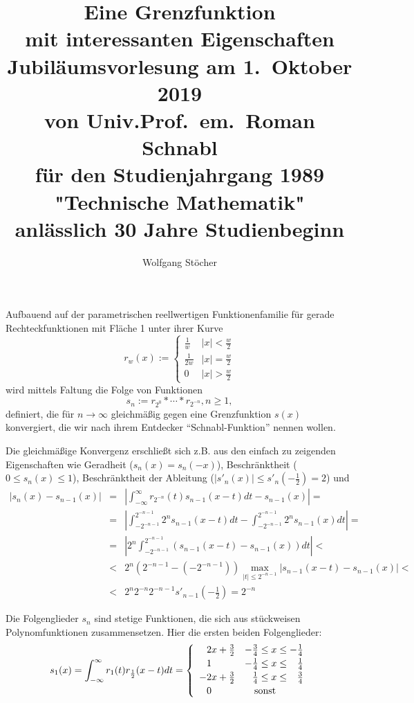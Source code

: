 \documentclass[german]{article}
\title{Eine Grenzfunktion\\ mit interessanten Eigenschaften\\[0.4em]
\large Jubiläumsvorlesung am 1.\ Oktober 2019\\
von Univ.Prof.\ em.\ Roman Schnabl\\
für den Studienjahrgang 1989 "Technische Mathematik"\\
anlässlich 30 Jahre Studienbeginn
}
\author{Wolfgang Stöcher}
\begin{document}
\maketitle

Aufbauend auf der parametrischen reellwertigen Funktionenfamilie für gerade Rechteckfunktionen mit Fläche 1 unter ihrer Kurve
\[
r_w(x) := \left\{
	\begin{array}{ll}
		\frac{1}{w}  & |x| < \frac{w}{2} \\[2pt]
		\frac{1}{2w} & |x| = \frac{w}{2} \\[2pt]
		0            & |x| > \frac{w}{2} 
	\end {array} 
	\right.
\]
wird mittels Faltung die Folge von Funktionen
\[
s_n := r_{2^0} \ast \cdots \ast r_{2^{-n}}, n \ge 1,
\]
definiert, die für $n \rightarrow \infty$ gleichmäßig gegen eine Grenzfunktion $s(x)$ konvergiert,
die wir nach ihrem Entdecker ``Schnabl-Funktion'' nennen wollen.

Die gleichmäßige Konvergenz erschließt sich z.B. aus den einfach zu zeigenden Eigenschaften
wie Geradheit ($s_n(x) = s_n(-x)$), Beschränktheit ($0 \le s_n(x) \le 1$),
Beschränktheit der Ableitung ($|s'_{n}(x)| \le s'_n(-\frac{1}{2}) = 2$) und
\[
\begin{array}{lcl}
  \left | s_{n}(x) - s_{n-1}(x) \right | & = & \left | \int_{-\infty}^{\infty} r_{2^{-n}}(t)s_{n-1}(x-t) dt - s_{n-1}(x) \right | = \\[0.4em]
                                         & = & \left | \int_{-2^{-n-1}}^{2^{-n-1}} 2^{n} s_{n-1}(x-t) dt - \int_{-2^{-n-1}}^{2^{-n-1}} 2^{n} s_{n-1}(x) dt \right | = \\[0.4em]
                                         & = & \left | 2^{n} \int_{-2^{-n-1}}^{2^{-n-1}} (s_{n-1}(x-t) - s_{n-1}(x)) dt \right | < \\[0.2em]
                                         & < & 2^{n} (2^{-n-1} - (-2^{-n-1})) \max_{|t| \le 2^{-n-1}} \left | s_{n-1}(x-t) - s_{n-1}(x) \right | < \\[0.2em]
                                         & < & 2^{n} 2^{-n} 2^{-n-1} s'_{n-1}(-\frac{1}{2}) = 2^{-n}
\end {array}
\]

Die Folgenglieder $s_n$ sind stetige Funktionen, die sich aus stückweisen Polynomfunktionen zusammensetzen.
Hier die ersten beiden Folgenglieder:
\[
s_1(x) = \int_{-\infty}^{\infty} r_1(t)r_\frac{1}{2}(x-t) dt = \left\{
	\begin{array}{ll}
		\hphantom{-}2x + \frac{3}{2}&           - \frac{3}{4} \le x \le           - \frac{1}{4} \\[2pt]
		\hphantom{-}1               &           - \frac{1}{4} \le x \le \hphantom{-}\frac{1}{4} \\[2pt]
		          - 2x + \frac{3}{2}& \hphantom{-}\frac{1}{4} \le x \le \hphantom{-}\frac{3}{4} \\[2pt]
		\hphantom{-}0               & \quad\mbox{sonst} 
	\end {array} 
	\right.
\]
\end{document}
